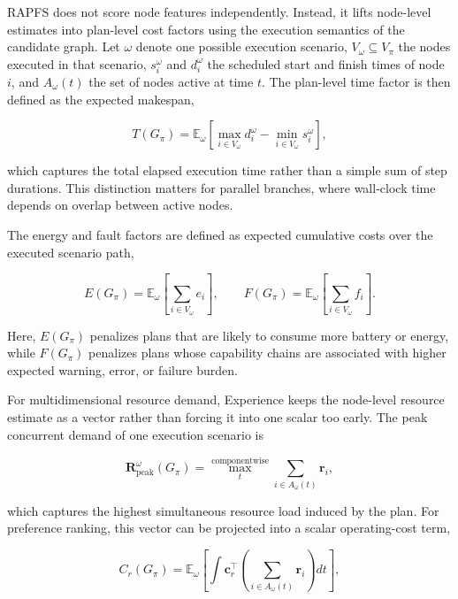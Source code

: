 \documentclass[letterpaper, 10pt, conference]{ieeeconf}
\begin{document}
RAPFS does not score node features independently. Instead, it lifts node-level estimates into plan-level cost factors using the execution semantics of the candidate graph. Let $\omega$ denote one possible execution scenario, $V_{\omega}\subseteq V_{\pi}$ the nodes executed in that scenario, $s_i^{\omega}$ and $d_i^{\omega}$ the scheduled start and finish times of node $i$, and $A_{\omega}(t)$ the set of nodes active at time $t$. The plan-level time factor is then defined as the expected makespan,

\begin{equation}
T(G_{\pi})=
\mathbb{E}_{\omega}\left[
\max_{i\in V_{\omega}} d_i^{\omega}
-
\min_{i\in V_{\omega}} s_i^{\omega}
\right],
\end{equation}

which captures the total elapsed execution time rather than a simple sum of step durations. This distinction matters for parallel branches, where wall-clock time depends on overlap between active nodes.

The energy and fault factors are defined as expected cumulative costs over the executed scenario path,

\begin{equation}
E(G_{\pi})=\mathbb{E}_{\omega}\left[\sum_{i\in V_{\omega}} e_i\right],
\qquad
F(G_{\pi})=\mathbb{E}_{\omega}\left[\sum_{i\in V_{\omega}} f_i\right].
\end{equation}

Here, $E(G_{\pi})$ penalizes plans that are likely to consume more battery or energy, while $F(G_{\pi})$ penalizes plans whose capability chains are associated with higher expected warning, error, or failure burden.

For multidimensional resource demand, Experience keeps the node-level resource estimate as a vector rather than forcing it into one scalar too early. The peak concurrent demand of one execution scenario is

\begin{equation}
\mathbf{R}_{\mathrm{peak}}^{\omega}(G_{\pi})=
\max_{t}^{\mathrm{componentwise}}
\sum_{i\in A_{\omega}(t)} \mathbf{r}_i,
\end{equation}

which captures the highest simultaneous resource load induced by the plan. For preference ranking, this vector can be projected into a scalar operating-cost term,

\begin{equation}
C_r(G_{\pi})=
\mathbb{E}_{\omega}\left[
\int \mathbf{c}_r^{\top}
\left(\sum_{i\in A_{\omega}(t)} \mathbf{r}_i\right) dt
\right],
\end{equation}
\end{document}
